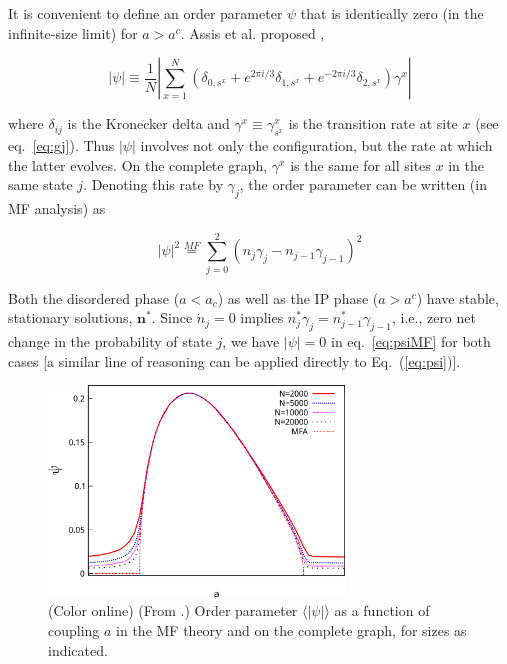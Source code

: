 It is convenient to define an order parameter $\psi$ that is identically zero (in the infinite-size limit) for $a>a^c$. Assis et al.
proposed \cite{assis2011infinite},
\vspace{1em}

\begin{equation}
    \label{eq:psi}
    |\psi| \equiv \frac{1}{N}\left| \sum_{x=1}^N \left( \delta_{0,s^x} + e^{2\pi i/3}\delta_{1,s^x} + e^{-2\pi i/3}\delta_{2,s^x} \right) \gamma^x \right|
\end{equation}
\vspace{1em}

\noindent where $\delta_{ij}$ is the Kronecker delta and $\gamma^x \equiv \gamma^x_{s^x}$ is the transition rate at site $x$ (see
eq.~\ref{eq:gj}). Thus $|\psi|$ involves not only the configuration, but the rate at which the latter evolves.  On the complete graph,
$\gamma^x$ is the same for all sites $x$ in the same state $j$. Denoting this rate by $\gamma_j$, the order parameter can be written
(in MF analysis) as

\begin{equation}
    \label{eq:psiMF}
    |\psi|^2 \stackrel{MF}{=} \sum_{j=0}^2 (n_j \gamma_j - n_{j-1} \gamma_{j-1})^2 
\end{equation}

\noindent Both the disordered phase ($a< a_c$) as well as the IP phase ($a>a^c$) have stable, stationary solutions, $\textbf{n}^*$.
Since $\dot{n}_j = 0$ implies $n^*_j\gamma_j = n^*_{j-1}\gamma_{j-1}$, i.e., zero net change in the probability of state $j$, we have
$|\psi|=0$ in eq.~\ref{eq:psiMF} for both cases [a similar line of reasoning can be applied directly to Eq.~(\ref{eq:psi})].

\begin{figure}
\begin{center}
    \includegraphics[width=0.7\textwidth]{fig/chap2/psivsa.eps}
    \caption{\label{fig:psi}
        (Color online) (From \cite{assis2011infinite}.) Order parameter $\langle
        |\psi| \rangle$ as a function of coupling $a$ in the MF theory and
        on the complete graph, for sizes as indicated.
    }
\end{center}
\end{figure}

